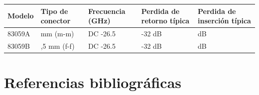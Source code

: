 \documentclass{article}
\begin{document}
	\begin{center}
		\tablefirsthead{}
		\tablehead{}
		\tabletail{}
		\tablelasttail{}
		\begin{supertabular}{|m{1.2659999cm}|m{2.873cm}|m{2.9329998cm}|m{3.136cm}|m{4.4570003cm}|}
			\hline
			\centering Modelo &
			\centering Tipo de conector &
			\centering Frecuencia (GHz) &
			\centering Perdida de retorno típica &
			\centering Perdida de inserción típica\\\hline
			\centering 83059A &
			 mm (m-m) &
			\centering DC -26.5 &
			\centering {}-32 dB  &
			 dB \\ \hline
			\centering 83059B &
			,5 mm (f-f) &
			\centering DC -26.5 &
			\centering {}-32 dB &
			 dB\\\hline
		\end{supertabular}
	\end{center}
	
	\section[Referencias bibliográficas]{Referencias bibliográficas}
		
	\printbibliography
	
\end{document}
